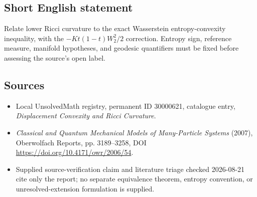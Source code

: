 \documentclass[11pt]{article}
\begin{document}
\subsection{Short English statement}
Relate lower Ricci curvature to the exact Wasserstein entropy-convexity inequality, with the \(-K t(1-t)W_2^2/2\) correction. Entropy sign, reference measure, manifold hypotheses, and geodesic quantifiers must be fixed before assessing the source's open label.
\subsection{Sources}
\begin{itemize}
\item Local UnsolvedMath registry, permanent ID 30000621, catalogue entry, \emph{Displacement Convexity and Ricci Curvature}.
\item \emph{Classical and Quantum Mechanical Models of Many-Particle Systems} (2007), Oberwolfach Reports, pp. 3189--3258, DOI \url{https://doi.org/10.4171/owr/2006/54}.
\item Supplied source-verification claim and literature triage checked 2026-08-21 cite only the report; no separate equivalence theorem, entropy convention, or unresolved-extension formulation is supplied.
\end{itemize}
\end{document}
